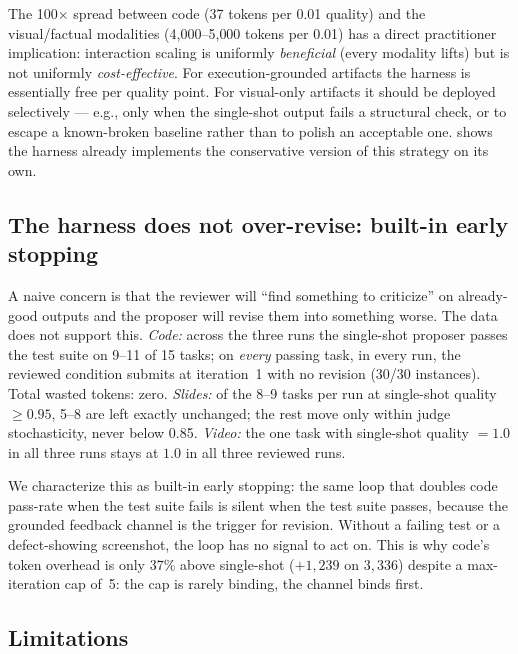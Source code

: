 The 100$\times$ spread between code (37 tokens per 0.01 quality) and the visual/factual modalities (4{,}000--5{,}000 tokens per 0.01) has a direct practitioner implication: interaction scaling is uniformly \emph{beneficial} (every modality lifts) but is not uniformly \emph{cost-effective}. For execution-grounded artifacts the harness is essentially free per quality point. For visual-only artifacts it should be deployed selectively --- e.g., only when the single-shot output fails a structural check, or to escape a known-broken baseline rather than to polish an acceptable one.  shows the harness already implements the conservative version of this strategy on its own.

\subsection{The harness does not over-revise: built-in early stopping}
\label{sec:harness-earlystop}

A naive concern is that the reviewer will ``find something to criticize'' on already-good outputs and the proposer will revise them into something worse. The data does not support this.
\emph{Code:} across the three runs the single-shot proposer passes the test suite on 9--11 of 15 tasks; on \emph{every} passing task, in every run, the reviewed condition submits at iteration~1 with no revision (30/30 instances). Total wasted tokens: zero.
\emph{Slides:} of the 8--9 tasks per run at single-shot quality $\geq 0.95$, 5--8 are left exactly unchanged; the rest move only within judge stochasticity, never below 0.85.
\emph{Video:} the one task with single-shot quality $= 1.0$ in all three runs stays at $1.0$ in all three reviewed runs.

We characterize this as built-in early stopping: the same loop that doubles code pass-rate when the test suite fails is silent when the test suite passes, because the grounded feedback channel is the trigger for revision. Without a failing test or a defect-showing screenshot, the loop has no signal to act on. This is why code's token overhead is only 37\% above single-shot ($+1{,}239$ on $3{,}336$) despite a max-iteration cap of~5: the cap is rarely binding, the channel binds first.

\subsection{Limitations}
\label{sec:harness-limits}

